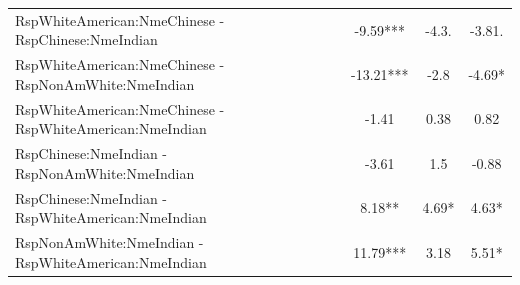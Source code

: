 \documentclass[]{report}
\begin{document}
\begin{table}
{\begin{tabular}[t]{lccc}
		RspWhiteAmerican:NmeChinese - RspChinese:NmeIndian & -9.59*** & -4.3. & -3.81. \\ 
		RspWhiteAmerican:NmeChinese - RspNonAmWhite:NmeIndian & -13.21*** & -2.8 & -4.69* \\ 
		RspWhiteAmerican:NmeChinese - RspWhiteAmerican:NmeIndian & -1.41 & 0.38 & 0.82 \\ 
		RspChinese:NmeIndian - RspNonAmWhite:NmeIndian & -3.61 & 1.5 & -0.88 \\ 
		RspChinese:NmeIndian - RspWhiteAmerican:NmeIndian & 8.18** & 4.69* & 4.63* \\ 
		RspNonAmWhite:NmeIndian - RspWhiteAmerican:NmeIndian & 11.79*** & 3.18 & 5.51* \\ 
		\hline
	\end{tabular}}
\end{table}
\end{document}
